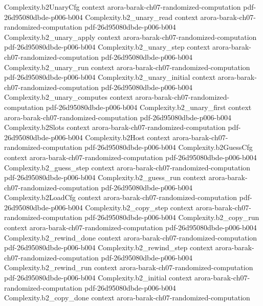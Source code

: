 \begin{theorem}
\proofstep
  {Complexity.b2UnaryCfg}
  {context}
  {arora-barak-ch07-randomized-computation}
  {pdf-26d95080dbde-p006-b004}
\proofstep
  {Complexity.b2_unary_read}
  {context}
  {arora-barak-ch07-randomized-computation}
  {pdf-26d95080dbde-p006-b004}
\proofstep
  {Complexity.b2_unary_apply}
  {context}
  {arora-barak-ch07-randomized-computation}
  {pdf-26d95080dbde-p006-b004}
\proofstep
  {Complexity.b2_unary_step}
  {context}
  {arora-barak-ch07-randomized-computation}
  {pdf-26d95080dbde-p006-b004}
\proofstep
  {Complexity.b2_unary_run}
  {context}
  {arora-barak-ch07-randomized-computation}
  {pdf-26d95080dbde-p006-b004}
\proofstep
  {Complexity.b2_unary_initial}
  {context}
  {arora-barak-ch07-randomized-computation}
  {pdf-26d95080dbde-p006-b004}
\proofstep
  {Complexity.b2_unary_computes}
  {context}
  {arora-barak-ch07-randomized-computation}
  {pdf-26d95080dbde-p006-b004}
\proofstep
  {Complexity.b2_unary_first}
  {context}
  {arora-barak-ch07-randomized-computation}
  {pdf-26d95080dbde-p006-b004}
\proofstep
  {Complexity.b2Slots}
  {context}
  {arora-barak-ch07-randomized-computation}
  {pdf-26d95080dbde-p006-b004}
\proofstep
  {Complexity.b2Host}
  {context}
  {arora-barak-ch07-randomized-computation}
  {pdf-26d95080dbde-p006-b004}
\proofstep
  {Complexity.b2GuessCfg}
  {context}
  {arora-barak-ch07-randomized-computation}
  {pdf-26d95080dbde-p006-b004}
\proofstep
  {Complexity.b2_guess_step}
  {context}
  {arora-barak-ch07-randomized-computation}
  {pdf-26d95080dbde-p006-b004}
\proofstep
  {Complexity.b2_guess_run}
  {context}
  {arora-barak-ch07-randomized-computation}
  {pdf-26d95080dbde-p006-b004}
\proofstep
  {Complexity.b2LoadCfg}
  {context}
  {arora-barak-ch07-randomized-computation}
  {pdf-26d95080dbde-p006-b004}
\proofstep
  {Complexity.b2_copy_step}
  {context}
  {arora-barak-ch07-randomized-computation}
  {pdf-26d95080dbde-p006-b004}
\proofstep
  {Complexity.b2_copy_run}
  {context}
  {arora-barak-ch07-randomized-computation}
  {pdf-26d95080dbde-p006-b004}
\proofstep
  {Complexity.b2_rewind_done}
  {context}
  {arora-barak-ch07-randomized-computation}
  {pdf-26d95080dbde-p006-b004}
\proofstep
  {Complexity.b2_rewind_step}
  {context}
  {arora-barak-ch07-randomized-computation}
  {pdf-26d95080dbde-p006-b004}
\proofstep
  {Complexity.b2_rewind_run}
  {context}
  {arora-barak-ch07-randomized-computation}
  {pdf-26d95080dbde-p006-b004}
\proofstep
  {Complexity.b2_initial}
  {context}
  {arora-barak-ch07-randomized-computation}
  {pdf-26d95080dbde-p006-b004}
\proofstep
  {Complexity.b2_copy_done}
  {context}
  {arora-barak-ch07-randomized-computation}

\end{theorem}
